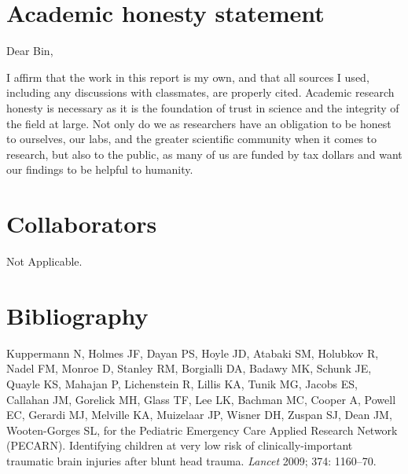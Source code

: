\documentclass[10pt,letterpaper]{article}
\begin{document}
\section{Academic honesty statement}\label{academic-honesty-statement}

Dear Bin,

I affirm that the work in this report is my own, and that all sources I used, including any discussions with classmates, are properly cited. Academic research honesty is necessary as it is the foundation of trust in science and the integrity of the field at large. Not only do we as researchers have an obligation to be honest to ourselves, our labs, and the greater scientific community when it comes to research, but also to the public, as many of us are funded by tax dollars and want our findings to be helpful to humanity.

\section{Collaborators}\label{collaborators}

Not Applicable.

\section{Bibliography}\label{bibliography}

Kuppermann N, Holmes JF, Dayan PS, Hoyle JD, Atabaki SM, Holubkov R, Nadel FM, Monroe D, Stanley RM,
Borgialli DA, Badawy MK, Schunk JE, Quayle KS, Mahajan P, Lichenstein R, Lillis KA, Tunik MG, Jacobs
ES, Callahan JM, Gorelick MH, Glass TF, Lee LK, Bachman MC, Cooper A, Powell EC, Gerardi MJ, Melville
KA, Muizelaar JP, Wisner DH, Zuspan SJ, Dean JM, Wooten-Gorges SL, for the Pediatric Emergency Care
Applied Research Network (PECARN). Identifying children at very low risk of clinically-important
traumatic brain injuries after blunt head trauma. \emph{Lancet} 2009; 374: 1160--70.
\end{document}
